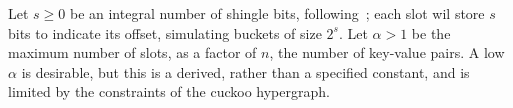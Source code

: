 \documentclass[11pt,letterpaper]{article}
\begin{document}






Let $s \geq 0$ be an integral number of shingle bits, following~\cite{lehman20093}; each slot wil store $s$ bits to indicate its offset, simulating buckets of size $2^s$.
Let $\alpha > 1$ be the maximum number of slots, as a factor of $n$, the number of key-value pairs.
A low $\alpha$ is desirable, but this is a derived, rather than a specified constant, and is limited by the constraints of the cuckoo hypergraph.
\end{document}
